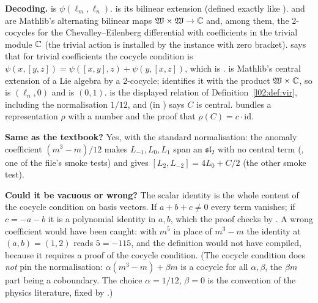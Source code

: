 \begin{dictionary}
\textbf{Decoding.}  is $\psi(\ell_m,\ell_n)$.  is its bilinear
extension (defined exactly like ).  and
 are Mathlib's alternating bilinear maps $\mathfrak{W}\times\mathfrak{W}\to{\mathbb{C}}$ and,
among them, the 2-cocycles for the Chevalley--Eilenberg differential with coefficients in the
trivial module ${\mathbb{C}}$ (the trivial action is installed by the  instance with
zero bracket). \allowbreak{}\allowbreak{}\allowbreak{}\allowbreak{} says that for trivial coefficients the cocycle
condition is $\psi(x,[y,z]) = \psi([x,y],z)+\psi(y,[x,z])$, which is .
\allowbreak{} is Mathlib's central extension of a Lie algebra by a 2-cocycle;
 identifies it with the product $\mathfrak{W}\times{\mathbb{C}}$, so  is $(\ell_n,0)$ and
 is $(0,1)$.  is the displayed relation of
Definition~\ref{l02:def:vir}, including the normalisation $1/12$, and  (in
) says $C$ is central.  bundles a representation $\rho$
with a number  and the proof that $\rho(C) = c\cdot\mathrm{id}$.

\textbf{Same as the textbook?} Yes, with the standard normalisation: the anomaly coefficient
$(m^3-m)/12$ makes $L_{-1},L_0,L_1$ span an $\mathfrak{sl}_2$ with no central term
(, one of the file's smoke tests) and gives $[L_2,L_{-2}] = 4L_0 + C/2$
(the other smoke test).

\textbf{Could it be vacuous or wrong?} The scalar identity  is the whole
content of the cocycle condition on basis vectors. If $a+b+c\ne0$ every term vanishes; if
$c=-a-b$ it is a polynomial identity in $a,b$, which the proof checks by . A wrong
coefficient would have been caught: with $m^5$ in place of $m^3-m$ the identity at $(a,b)=(1,2)$
reads $5 = -115$, and the definition  would not have compiled, because it requires a
proof of the cocycle condition. (The cocycle condition does \emph{not} pin the normalisation:
$\alpha(m^3-m)+\beta m$ is a cocycle for all $\alpha,\beta$, the $\beta m$ part being a coboundary.
The choice $\alpha = 1/12$, $\beta=0$ is the convention of the physics literature, fixed by
.)
\end{dictionary}

